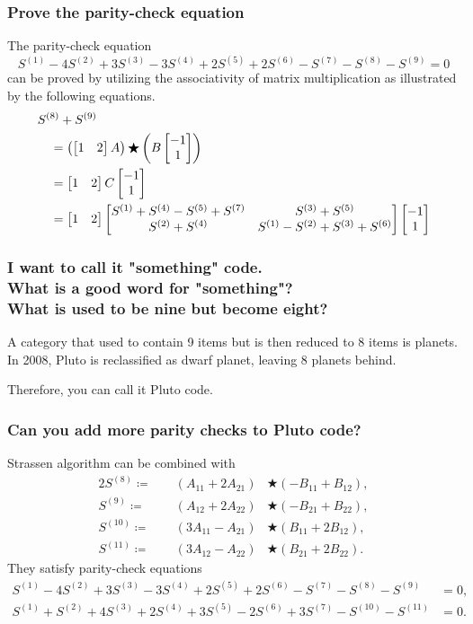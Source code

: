 \documentclass[aspectratio=169, t]{beamer}
\def\block#1#2{_{#1#2}}
\def\series#1{^{(#1)}}
\def\A{A\block}
\def\B{B\block}
\def\S{S\series}
\def\bma#1{\begin{bmatrix}#1\end{bmatrix}}
\begin{document}
\begin{frame}
	\frametitle{Prove the parity-check equation}

	The parity-check equation
	\[ \S1 - 4\S2 + 3\S3 - 3\S4 + 2\S5 + 2\S6 - \S7 - \S8 - \S9 = 0 \]
	can be proved by utilizing the associativity of matrix multiplication
	as illustrated by the following equations.
	\begin{align*}
		\kern1em&\kern-1em
		\S8 + \S9 \\
		& = \left( \bma{1 & 2}A \right) \bigstar
			\left( B \bma{-1 \\ 1} \right) \\
		& = \bma{1 & 2} C \bma{-1 \\ 1} \\
		& = \bma{1 & 2}
		\bma{
			\S1 + \S4 - \S5 + \S7 & \S3 + \S5 \\
			\S2 + \S4 & \S1 - \S2 + \S3 + \S6   
		}
		\bma{-1 \\ 1}
	\end{align*}
\end{frame}

\begin{frame}
	\frametitle{I want to call it "something" code. \\
				What is a good word for "something"? \\
				What is used to be nine but become eight?}

	A category that used to contain 9 items
	but is then reduced to 8 items is planets.
	In 2008, Pluto is reclassified as dwarf planet,
	leaving 8 planets behind.

	Therefore, you can call it Pluto code.
\end{frame}

\begin{frame}
	\frametitle{Can you add more parity checks to Pluto code?}

	Strassen algorithm can be combined with
	\def\={\coloneqq}
	\def\*{\bigstar}
	\begin{alignat*}{2}
		\S8    \= &&   (\A11 + 2\A21)  & \*  (-\B11 + \B12),  \\
		\S9    \= &&   (\A12 + 2\A22)  & \*  (-\B21 + \B22),  \\
		\S{10} \= &&   (3\A11 - \A21)  & \*  (\B11 + 2\B12),  \\
		\S{11} \=&\;&  (3\A12 - \A22)  & \*  (\B21 + 2\B22).    
	\end{alignat*}
	They satisfy parity-check equations
	\begin{align*}
		\S1 - 4\S2 + 3\S3 - 3\S4 + 2\S5 + 2\S6 - \S7 - \S8 - \S9 & = 0, \\
		\S1 + \S2 + 4\S3 + 2\S4 + 3\S5 - 2\S6 + 3\S7 - \S{10} - \S{11} & = 0.
	\end{align*}
\end{frame}
\end{document}
